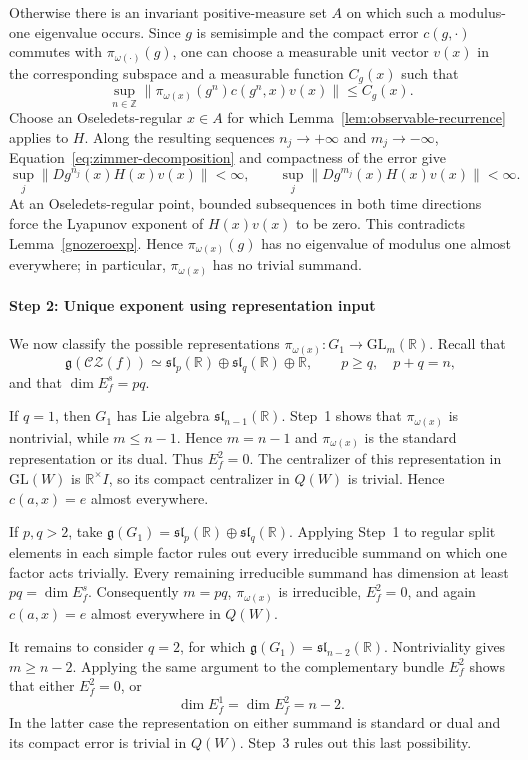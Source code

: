 \documentclass[11pt]{amsart}
\numberwithin{equation}{section}
\newcommand{\CZ}{\mathcal{CZ}}
\newcommand{\GL}{\mathrm{GL}}
\theoremstyle{plain}
\begin{document}
Otherwise there is an invariant positive-measure set $A$ on which such a modulus-one
eigenvalue occurs.  Since $g$ is semisimple and the compact error
$c(g,\cdot)$ commutes with $\pi_{\omega(\cdot)}(g)$, one can choose a
measurable unit vector $v(x)$ in the corresponding subspace and a
measurable function $C_g(x)$ such that
\[
\sup_{n\in\mathbb Z}
 \|\pi_{\omega(x)}(g^n)c(g^n,x)v(x)\|\le C_g(x).
\]
Choose an Oseledets-regular $x\in A$ for which
Lemma~\ref{lem:observable-recurrence} applies to $H$.  Along the
resulting sequences $n_j\to+\infty$ and $m_j\to-\infty$,
Equation~\eqref{eq:zimmer-decomposition} and compactness of the error
give
\[
\sup_j\|Dg^{n_j}(x)H(x)v(x)\|<\infty,
\qquad
\sup_j\|Dg^{m_j}(x)H(x)v(x)\|<\infty.
\]
At an Oseledets-regular point, bounded subsequences in both time
directions force the Lyapunov exponent of $H(x)v(x)$ to be zero.  This
contradicts Lemma~\ref{gnozeroexp}.  Hence
$\pi_{\omega(x)}(g)$ has no eigenvalue of modulus one almost everywhere;
in particular, $\pi_{\omega(x)}$ has no trivial summand.


\paragraph{\textbf{Step 2: Unique exponent using representation input}}


We now classify the possible representations
$\pi_{\omega(x)}:G_1\to\GL_m(\mathbb R)$.  Recall that
\[
\mathfrak g(\CZ(f))\simeq
\mathfrak{sl}_p(\mathbb R)\oplus
\mathfrak{sl}_q(\mathbb R)\oplus\mathbb R,
\qquad p\ge q,\quad p+q=n,
\]
and that $\dim E_f^s=pq$.

If $q=1$, then $G_1$ has Lie algebra
$\mathfrak{sl}_{n-1}(\mathbb R)$.  Step~1 shows that
$\pi_{\omega(x)}$ is nontrivial, while $m\le n-1$.  Hence $m=n-1$
and $\pi_{\omega(x)}$ is the standard representation or its dual.
Thus $E_f^2=0$.  The centralizer of this representation in
$\GL(W)$ is $\mathbb R^\times I$, so its compact centralizer in
$Q(W)$ is trivial.  Hence $c(a,x)=e$ almost everywhere.

If $p,q>2$, take
$\mathfrak g(G_1)=\mathfrak{sl}_p(\mathbb R)\oplus
\mathfrak{sl}_q(\mathbb R)$.  Applying Step~1 to regular split elements
in each simple factor rules out every irreducible summand on which one
factor acts trivially.  Every remaining irreducible summand has dimension
at least $pq=\dim E_f^s$.  Consequently $m=pq$,
$\pi_{\omega(x)}$ is irreducible, $E_f^2=0$, and again
$c(a,x)=e$ almost everywhere in $Q(W)$.

It remains to consider $q=2$, for which
$\mathfrak g(G_1)=\mathfrak{sl}_{n-2}(\mathbb R)$.  Nontriviality gives
$m\ge n-2$.  Applying the same argument to the complementary bundle
$E_f^2$ shows that either $E_f^2=0$, or
\[
\dim E_f^1=\dim E_f^2=n-2.
\]
In the latter case the representation on either summand is standard or
dual and its compact error is trivial in $Q(W)$.  Step~3 rules out this
last possibility.
\end{document}
